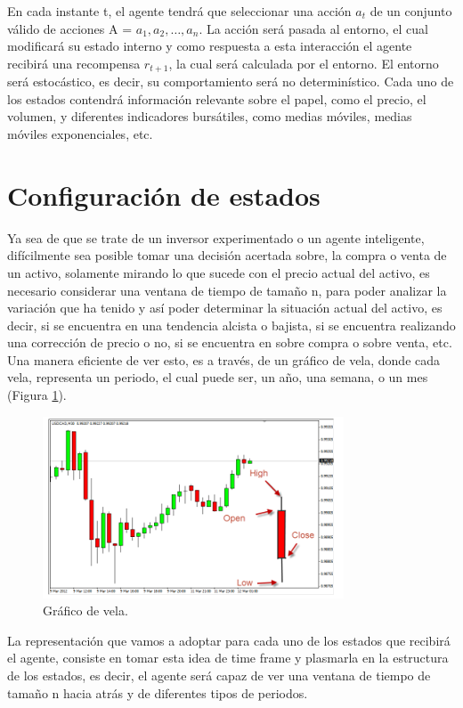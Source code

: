En cada instante t, el agente tendrá que seleccionar una acción $a_t$  de un conjunto válido de acciones A = {$a_1, a_2, …, a_n$}. La acción será pasada al entorno, el cual modificará su estado interno y como respuesta a esta interacción el agente recibirá una recompensa $r_{t + 1}$, la cual será calculada por el entorno. El entorno será estocástico, es decir, su comportamiento será no determinístico. Cada uno de los estados contendrá información relevante sobre el papel, como el precio, el volumen, y diferentes indicadores bursátiles, como medias móviles, medias móviles exponenciales, etc.

\section{Configuración de estados}

Ya sea de que se trate de un inversor experimentado o un agente inteligente, difícilmente sea posible tomar una decisión acertada sobre, la compra o venta de un activo, solamente mirando lo que sucede con el precio actual 
del activo, es necesario considerar una ventana de tiempo de tamaño n, para poder analizar la variación que ha tenido y así poder determinar la situación actual del activo, es decir, si se encuentra en una tendencia
alcista o bajista, si se encuentra realizando una corrección de precio o no, si se encuentra en sobre compra o sobre venta, etc. Una manera eficiente de ver esto, es a través, de un gráfico de vela, donde cada vela, representa un periodo, el cual puede ser, un año, una semana, o un mes (Figura \ref{fig:cap3:1}).

\begin{figure}[h!]
	\centering
	\includegraphics[scale=0.75]{imagenes/candleChart.png}
	\caption{Gráfico de vela.}
	\label{fig:cap3:1}
\end{figure}

La representación que vamos a adoptar para cada uno de los estados que recibirá el agente, consiste en tomar esta idea de time frame y plasmarla en la estructura de los estados, es decir, el agente será capaz de ver una ventana de tiempo de tamaño n hacia atrás y de diferentes tipos de periodos.

